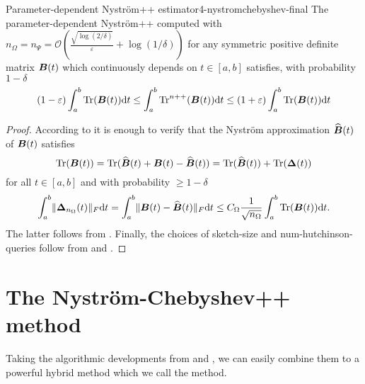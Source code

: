 \begin{theorem}{Parameter-dependent Nystr\"om++ estimator}{4-nystromchebyshev-final}
    The parameter-dependent Nystr\"om++ computed with
    $n_{\Omega} = n_{\Psi} = \mathcal{O}\left( \frac{\sqrt{\log(2/\delta)}}{\varepsilon} + \log(1/\delta) \right)$
    for any symmetric positive definite matrix $\boldsymbol{B}(t)$ which continuously
    depends on $t \in [a, b]$ satisfies, with probability
    $1 - \delta$
    \begin{equation}
        (1 - \varepsilon) \int_{a}^{b}\operatorname{Tr}(\boldsymbol{B}(t)) \mathrm{d}t \leq \int_{a}^{b}\operatorname{Tr}^{n++}(\boldsymbol{B}(t)) \mathrm{d}t \leq  (1 + \varepsilon) \int_{a}^{b}\operatorname{Tr}(\boldsymbol{B}(t)) \mathrm{d}t
    \end{equation}
\end{theorem}

\begin{proof}
    According to  it is enough to verify that the Nystr\"om approximation $\widehat{\boldsymbol{B}}(t)$ of $\boldsymbol{B}(t)$ satisfies
    \begin{equation}
        \operatorname{Tr}(\boldsymbol{B}(t)) = \operatorname{Tr}(\widehat{\boldsymbol{B}}(t) + \boldsymbol{B}(t) - \widehat{\boldsymbol{B}}(t)) = \operatorname{Tr}(\widehat{\boldsymbol{B}}(t)) + \operatorname{Tr}(\boldsymbol{\Delta}(t))
    \end{equation}
    for all $t \in [a, b]$ and with probability $\geq 1 - \delta$
    \begin{equation}
        \int_{a}^{b} \lVert \boldsymbol{\Delta}_{n_{\Omega}}(t) \rVert _F \mathrm{d}t = \int_{a}^{b} \lVert \boldsymbol{B}(t) - \widehat{\boldsymbol{B}}(t) \rVert _F \mathrm{d}t \leq C_{\Omega} \frac{1}{\sqrt{n_{\Omega}}} \int_{a}^{b} \operatorname{Tr}(\boldsymbol{B}(t)) \mathrm{d}t.
    \end{equation}
    The latter follows from . Finally, the choices of \gls{sketch-size} and \gls{num-hutchinson-queries} follow from  and .
\end{proof}


\section{The Nystr\"om-Chebyshev++ method}
\label{sec:4-nystromchebyshev-nystromchebyshev-pp}

Taking the algorithmic developments from  and ,
we can easily combine them to a powerful hybrid method which we call the 
method.

